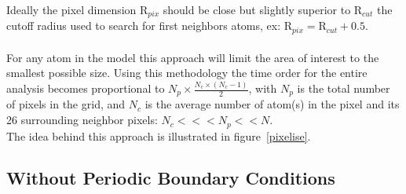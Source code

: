 \documentclass[9pt,tutorial]{livecoms}
\newcommand{\Rc}{\text{R}_{cut}}
\newcommand{\Pc}{\text{R}_{pix}}
\begin{document}
Ideally the pixel dimension $\Pc$ should be close but slightly superior to $\Rc$ the cutoff radius used to search for first neighbors atoms, ex: $\Pc = \Rc + 0.5$. \\
\\ 
For any atom in the model this approach will limit the area of interest to the smallest possible size. 
Using this methodology the time order for the entire analysis becomes proportional to $N_p \times \frac{N_c \times (N_c - 1)}{2} $, 
with $N_p$ is the total number of pixels in the grid, and $N_c$ is the average number of atom(s) in the pixel and its 26 surrounding neighbor pixels: $N_c <<< N_p << N$. \\ 
The idea behind this approach is illustrated in figure~\ref{pixelise}. 

\subsection{Without Periodic Boundary Conditions\label{nopbc}}
\end{document}
